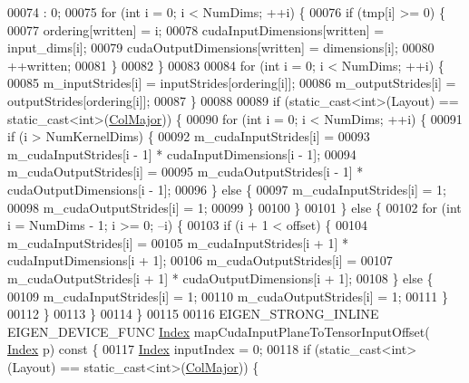 \begin{DoxyCode}
00074                       : 0;
00075     \textcolor{keywordflow}{for} (\textcolor{keywordtype}{int} i = 0; i < NumDims; ++i) \{
00076       \textcolor{keywordflow}{if} (tmp[i] >= 0) \{
00077         ordering[written] = i;
00078         cudaInputDimensions[written] = input\_dims[i];
00079         cudaOutputDimensions[written] = dimensions[i];
00080         ++written;
00081       \}
00082     \}
00083 
00084     \textcolor{keywordflow}{for} (\textcolor{keywordtype}{int} i = 0; i < NumDims; ++i) \{
00085       m\_inputStrides[i] = inputStrides[ordering[i]];
00086       m\_outputStrides[i] = outputStrides[ordering[i]];
00087     \}
00088 
00089     \textcolor{keywordflow}{if} (static\_cast<int>(Layout) == \textcolor{keyword}{static\_cast<}\textcolor{keywordtype}{int}\textcolor{keyword}{>}(\hyperlink{group__enums_ggaacded1a18ae58b0f554751f6cdf9eb13a0cbd4bdd0abcfc0224c5fcb5e4f6669a}{ColMajor})) \{
00090       \textcolor{keywordflow}{for} (\textcolor{keywordtype}{int} i = 0; i < NumDims; ++i) \{
00091         \textcolor{keywordflow}{if} (i > NumKernelDims) \{
00092           m\_cudaInputStrides[i] =
00093               m\_cudaInputStrides[i - 1] * cudaInputDimensions[i - 1];
00094           m\_cudaOutputStrides[i] =
00095               m\_cudaOutputStrides[i - 1] * cudaOutputDimensions[i - 1];
00096         \} \textcolor{keywordflow}{else} \{
00097           m\_cudaInputStrides[i] = 1;
00098           m\_cudaOutputStrides[i] = 1;
00099         \}
00100       \}
00101     \} \textcolor{keywordflow}{else} \{
00102       \textcolor{keywordflow}{for} (\textcolor{keywordtype}{int} i = NumDims - 1; i >= 0; --i) \{
00103         \textcolor{keywordflow}{if} (i + 1 < offset) \{
00104           m\_cudaInputStrides[i] =
00105               m\_cudaInputStrides[i + 1] * cudaInputDimensions[i + 1];
00106           m\_cudaOutputStrides[i] =
00107               m\_cudaOutputStrides[i + 1] * cudaOutputDimensions[i + 1];
00108         \} \textcolor{keywordflow}{else} \{
00109           m\_cudaInputStrides[i] = 1;
00110           m\_cudaOutputStrides[i] = 1;
00111         \}
00112       \}
00113     \}
00114   \}
00115 
00116   EIGEN\_STRONG\_INLINE EIGEN\_DEVICE\_FUNC \hyperlink{namespace_eigen_a62e77e0933482dafde8fe197d9a2cfde}{Index} mapCudaInputPlaneToTensorInputOffset(
      \hyperlink{namespace_eigen_a62e77e0933482dafde8fe197d9a2cfde}{Index} p)\textcolor{keyword}{ const }\{
00117     \hyperlink{namespace_eigen_a62e77e0933482dafde8fe197d9a2cfde}{Index} inputIndex = 0;
00118     \textcolor{keywordflow}{if} (static\_cast<int>(Layout) == static\_cast<int>(\hyperlink{group__enums_ggaacded1a18ae58b0f554751f6cdf9eb13a0cbd4bdd0abcfc0224c5fcb5e4f6669a}{ColMajor})) \{

\end{DoxyCode}
